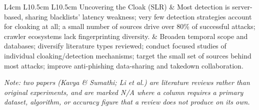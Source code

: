 \documentclass[10pt]{article}
\begin{document}
\begin{longtable}{L{4cm} L{10.5cm} L{10.5cm}}
Uncovering the Cloak (SLR)
 & Most detection is server-based, sharing blacklists' latency weakness; very few detection strategies account for cloaking at all; a small number of sources drive over 80\% of successful attacks; crawler ecosystems lack fingerprinting diversity.
 & Broaden temporal scope and databases; diversify literature types reviewed; conduct focused studies of individual cloaking/detection mechanisms; target the small set of sources behind most attacks; improve anti-phishing data-sharing and takedown collaboration. \\

\end{longtable}

\vspace{8pt}
\footnotesize\textit{Note: two papers (Kavya \& Sumathi; Li et al.) are literature reviews rather than
original experiments, and are marked N/A where a column requires a primary dataset, algorithm, or
accuracy figure that a review does not produce on its own.}
\end{document}
